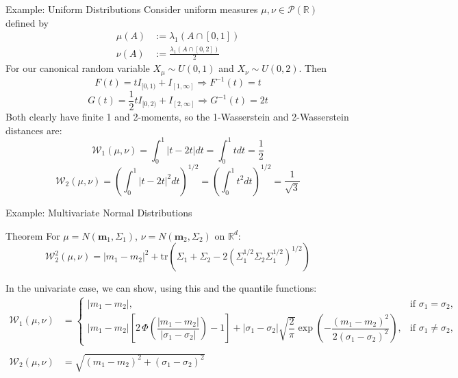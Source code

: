 \documentclass{beamer}
\begin{document}
\begin{frame}{Example: Uniform Distributions}
Consider uniform measures $\mu, \nu \in \mathcal{P}(\mathbb{R})$ defined by \begin{align*}
\mu (A) & := \lambda _1 (A \cap [0,1]) \\ 
\nu (A) & := \frac{\lambda _1 (A \cap [0,2]) }{2}
\end{align*}
For our canonical random variable $X_\mu \sim U(0,1)$ and $X_\nu \sim U(0,2)$. Then \[F(t) = tI_{[0,1)} + I_{[1,\infty]} \Longrightarrow F^{-1}(t) = t\]
\[G(t) = \frac{1}{2}tI_{[0,2)} + I_{[2,\infty]} \Longrightarrow G^{-1}(t) = 2t\]
Both clearly have finite 1 and 2-moments, so the 1-Wasserstein and 2-Wasserstein distances are:
\footnotesize
\[
\mathcal{W}_1(\mu,\nu) = \int_0^1 |t - 2t| dt = \int_0^1 t dt = \frac{1}{2}
\]
\[
\mathcal{W}_2(\mu,\nu) = \left(\int_0^1 |t - 2t|^2 dt\right)^{1/2} = \left(\int_0^1 t^2 dt\right)^{1/2} = \frac{1}{\sqrt{3}}
\]
\normalsize
\end{frame}

\begin{frame}{Example: Multivariate Normal Distributions}
  \begin{block}{Theorem}
    For $\mu = N(\mathbf{m}_1, \Sigma_1)$, $\nu = N(\mathbf{m}_2, \Sigma_2)$ on $\mathbb{R}^d$:
    \[
      \mathcal{W}_2^2(\mu, \nu) = |m_1 - m_2|^2 + \mathrm{tr}\left(\Sigma_1 + \Sigma_2 - 2 \left(\Sigma_1^{1/2}\Sigma_2\Sigma_1^{1/2}\right)^{1/2}\right)
    \]
  \end{block}
  In the univariate case, we can show, using this and the quantile functions: ~\\
  \tiny
  \begin{align*} \mathcal{W}_1(\mu, \nu) &= 
\begin{cases}
|m_1 - m_2|, & \text{if } \sigma_1 = \sigma_2, \\[10pt]
|m_1 - m_2|
\left[
2\,\Phi\!\left(
\dfrac{|m_1 - m_2|}{|\sigma_1 - \sigma_2|}
\right)
- 1
\right]
+ 
|\sigma_1 - \sigma_2|
\sqrt{\dfrac{2}{\pi}}
\exp\!\left(
-\dfrac{(m_1 - m_2)^2}{2(\sigma_1 - \sigma_2)^2}
\right),
& \text{if } \sigma_1 \neq \sigma_2,
\end{cases} \\ \\  \mathcal{W}_2 (\mu, \nu) &= \sqrt{(m_1-m_2)^2 + (\sigma_1-\sigma_2)^2}
  \end{align*}
\end{frame}
\end{document}
